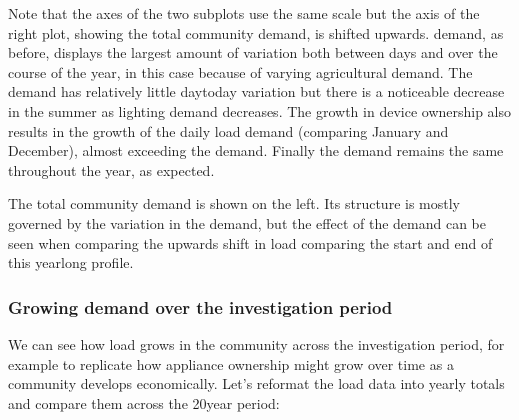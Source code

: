 \documentclass[letterpaper,10pt,english]{sphinxmanual}
\begin{document}
\noindent{}

\sphinxAtStartPar
Note that the axes of the two subplots use the same scale but the axis
of the right plot, showing the total community demand, is shifted
upwards.  demand, as before, displays the largest amount
of variation both between days and over the course of the year, in this
case because of varying agricultural demand. The  demand has
relatively little day\sphinxhyphen{}to\sphinxhyphen{}day variation but there is a noticeable
decrease in the summer as lighting demand decreases. The growth in
 device ownership also results in the growth of the daily
load demand (comparing January and December), almost exceeding the
 demand. Finally the  demand remains the same
throughout the year, as expected.

\sphinxAtStartPar
The total community demand is shown on the left. Its structure is mostly
governed by the variation in the  demand, but the effect
of the  demand can be seen when comparing the upwards shift
in load comparing the start and end of this year\sphinxhyphen{}long profile.


\subsubsection{Growing demand over the investigation period}
\label{\detokenize{load:growing-demand-over-the-investigation-period}}
\sphinxAtStartPar
We can see how load grows in the community across the investigation
period, for example to replicate how appliance ownership might grow over
time as a community develops economically. Let’s reformat the load data
into yearly totals and compare them across the 20\sphinxhyphen{}year period:
\end{document}
